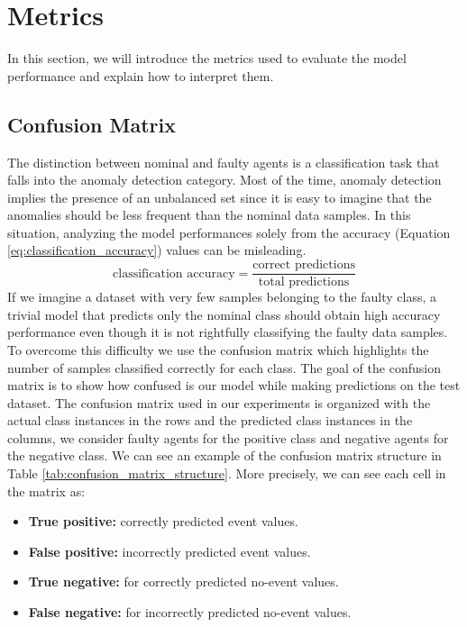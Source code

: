 \documentclass[../../Thesis.tex]{subfiles}
\begin{document}
	\section{Metrics}
		In this section, we will introduce the metrics used to evaluate the model performance and explain how to interpret them. 
		\subsection{Confusion Matrix}
			The distinction between nominal and faulty agents is a classification task that falls into the anomaly detection category. Most of the time, anomaly detection implies the presence of an unbalanced set since it is easy to imagine that the anomalies should be less frequent than the nominal data samples. In this situation, analyzing the model performances solely from the accuracy (Equation \ref{eq:classification_accuracy}) values can be misleading. 
			\begin{equation}
				\text{classification accuracy} = \frac{\text{correct predictions}}{\text{total predictions}}
				\label{eq:classification_accuracy}
			\end{equation}
			If we imagine a dataset with very few samples belonging to the faulty class, a trivial model that predicts only the nominal class should obtain high accuracy performance even though it is not rightfully classifying the faulty data samples. To overcome this difficulty we use the confusion matrix which highlights the number of samples classified correctly for each class.  The goal of the confusion matrix is to show how confused is our model while making predictions on the test dataset. The confusion matrix used in our experiments is organized with the actual class instances in the rows and the predicted class instances in the columns, we consider faulty agents for the positive class and negative agents for the negative class. We can see an example of the confusion matrix structure in Table \ref{tab:confusion_matrix_structure}. More precisely, we can see each cell in the matrix as:
			\begin{itemize}
				\item \textbf{True positive:} correctly predicted event values.
				\item \textbf{False positive:} incorrectly predicted event values.
				\item \textbf{True negative:} for correctly predicted no-event values.
				\item \textbf{False negative:} for incorrectly predicted no-event values.
			\end{itemize}
\end{document}
